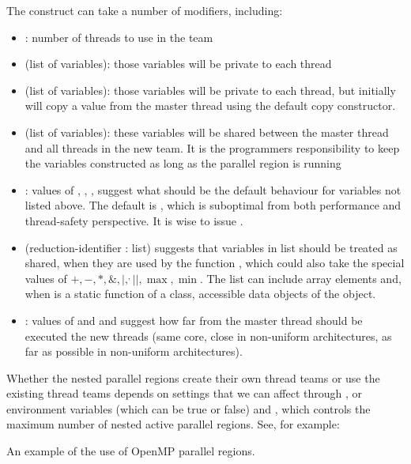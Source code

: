 The construct can take a number of modifiers, including:
\begin{itemize}
\item {}: number of threads to use in the team
\item {}(list of variables): those variables will be private to each thread 
\item {}(list of variables): those variables will be private to each thread, but initially will copy a value from the master thread using the default copy constructor. 
\item {}(list of variables): these variables will be shared between the master thread and all threads in the new team. It is the programmers responsibility to keep the variables constructed as long as the parallel region is running
\item {}: values of , , ,  suggest what should be the default behaviour for variables not listed above. The default is , which is suboptimal from both performance and thread-safety perspective. It is wise to issue . 
\item {}(reduction-identifier : list) suggests that variables in list should be treated as shared, when they are used by the function , which could also take the special values of $+, -, *, \&, |, ^, ||, \max, \min$. The list can include array elements and, when  is a static function of a class, accessible data objects of the object. \label{sec:reduction1}
\item {}: values of  and  and  suggest how far from the master thread should be executed the new threads (same core, close in non-uniform architectures, as far as possible in non-uniform architectures).
\end{itemize}

Whether the nested parallel regions create their own thread teams or use the existing thread teams depends on   
settings that we can affect through , or environment variables  (which can be true or false) and , which controls the maximum number of nested active parallel regions.
See, for example:

\raggedbottom
\begin{codebox}[]{\href{https://godbolt.org/z/Ejh5EfPqj}{\ExternalLink}}
\footnotesize An example of the use of OpenMP parallel regions.
\tcblower
{}
\end{codebox}

